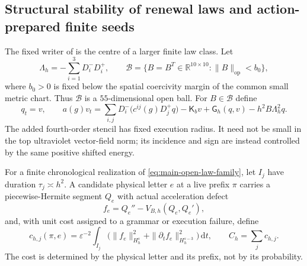 \documentclass[11pt]{article}
\numberwithin{equation}{section}
\theoremstyle{definition}
\theoremstyle{remark}
\newcommand{\dd}{\mathrm d}
\newcommand{\op}{\mathrm{op}}
\begin{document}
\subsection{Structural stability of renewal laws and action-prepared finite seeds}
\label{subsec:main-open-law-basin}

The fixed writer of  is the centre of a larger
finite law class.  Let
\begin{equation}
 \Lambda_h=-\sum_{i=1}^3D_i^-D_i^+,
 \qquad
 \mathcal B=\{B=B^T\in\mathbb R^{10\times10}:\|B\|_{\op}<b_0\},
 \label{eq:main-law-ball}
\end{equation}
where $b_0>0$ is fixed below the spatial coercivity margin of the common small
metric chart.  Thus $\mathcal B$ is a $55$-dimensional open ball.  For
$B\in\mathcal B$ define
\begin{equation}
 q_t=v,\qquad
 a(g)v_t=\sum_{i,j}D_i^-\!\bigl(c^{ij}(g)D_j^+q\bigr)
       -\mathsf K_bv+\mathsf G_h(q,v)-h^2B\Lambda_h^2q.
 \label{eq:main-open-law-family}
\end{equation}
The added fourth-order stencil has fixed execution radius.  It need not be
small in the top ultraviolet vector-field norm; its incidence and sign are
instead controlled by the same positive shifted energy.

For a finite chronological realization of \eqref{eq:main-open-law-family},
let $I_j$ have duration $\tau_j\asymp h^2$.  A candidate physical letter $e$
at a live prefix $\pi$ carries a piecewise-Hermite segment $Q_e$ with actual
acceleration defect
\begin{equation}
 f_e=Q_e''-V_{B,h}(Q_e,Q_e'),
 \label{eq:main-law-residual}
\end{equation}
and, with unit cost assigned to a grammar or execution failure, define
\begin{equation}
 c_{h,j}(\pi,e)=\varepsilon^{-2}
 \int_{I_j}\bigl(\|f_e\|_{H_h^s}^2
       +\|\partial_tf_e\|_{H_h^{s-3}}^2\bigr)\,\dd t,
 \qquad C_h=\sum_jc_{h,j}.
 \label{eq:main-law-cost}
\end{equation}
The cost is determined by the physical letter and its prefix, not by its
probability.
\end{document}
